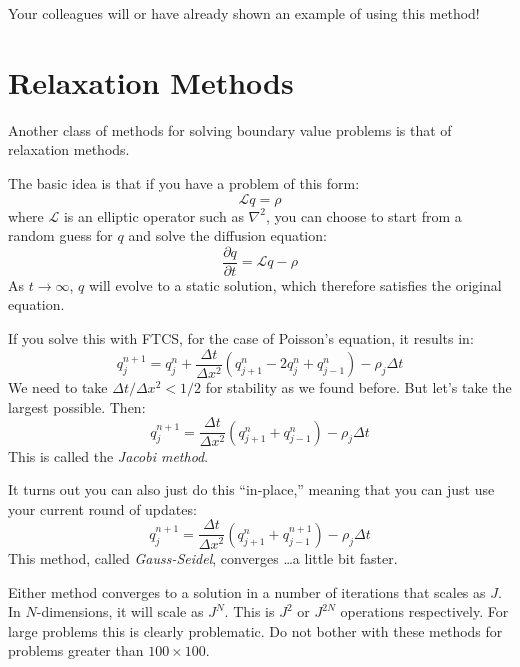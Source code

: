 Your colleagues will or have already shown an example of using this
method! 

\section{Relaxation Methods}

Another class of methods for solving boundary value problems is that
of relaxation methods.

The basic idea is that if you have a problem of this form:
\begin{equation}
\mathcal{L} q = \rho
\end{equation}
where $\mathcal{L}$ is an elliptic operator such as $\nabla^2$, you
can choose to start from a random guess for $q$ and solve the
diffusion equation:
\begin{equation}
\frac{\partial q}{\partial t} = \mathcal{L} q - \rho
\end{equation}
As $t\rightarrow\infty$, $q$ will evolve to a static solution, which
therefore satisfies the original equation. 

If you solve this with FTCS, for the case of Poisson's equation, it
results in:
\begin{equation}
q_j^{n+1} = q_j^n + \frac{\Delta t}{\Delta x^2} \left(q_{j+1}^n - 2
q_j^n +q_{j-1}^{n}\right) - \rho_j \Delta t
\end{equation}
We need to take $\Delta t / \Delta x^2 < 1/2$ for stability as we
found before. But let's take the largest possible. Then:
\begin{equation}
q_j^{n+1} = \frac{\Delta t}{\Delta x^2} \left(q_{j+1}^n
+q_{j-1}^{n}\right) - \rho_j \Delta t
\end{equation}
This is called the {\it Jacobi method}. 

It turns out you can also just do this ``in-place,'' meaning that you
can just use your current round of updates:
\begin{equation}
q_j^{n+1} = \frac{\Delta t}{\Delta x^2} \left(q_{j+1}^n 
+q_{j-1}^{n+1}\right) - \rho_j \Delta t
\end{equation}
This method, called {\it Gauss-Seidel}, converges \ldots a little bit
faster.

Either method converges to a solution in a number of iterations that
scales as $J$. In $N$-dimensions, it will scale as $J^N$. This is
$J^2$ or $J^{2N}$ operations respectively. For large problems this is
clearly problematic. Do not bother with these methods for problems
greater than $100\times 100$. 

